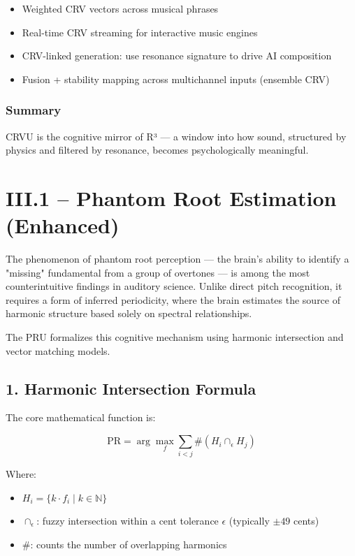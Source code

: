 \documentclass{article}
\begin{document}
\begin{itemize}
    \item Weighted CRV vectors across musical phrases
    \item Real-time CRV streaming for interactive music engines
    \item CRV-linked generation: use resonance signature to drive AI composition
    \item Fusion + stability mapping across multichannel inputs (ensemble CRV)
\end{itemize}

\subsubsection*{Summary}

CRVU is the cognitive mirror of R³ — a window into how sound, structured by physics and filtered by resonance, becomes psychologically meaningful.

\section*{III.1 – Phantom Root Estimation (Enhanced)}

The phenomenon of phantom root perception — the brain's ability to identify a "missing" fundamental from a group of overtones — is among the most counterintuitive findings in auditory science. Unlike direct pitch recognition, it requires a form of inferred periodicity, where the brain estimates the source of harmonic structure based solely on spectral relationships.

The PRU formalizes this cognitive mechanism using harmonic intersection and vector matching models.

\subsection*{1. Harmonic Intersection Formula}

The core mathematical function is:

\[
\text{PR} = \arg\max_f \sum_{i<j} \#(H_i \cap_\epsilon H_j)
\]

Where:

\begin{itemize}
    \item $H_i = \{k \cdot f_i \mid k \in \mathbb{N} \}$
    \item $\cap_\epsilon$: fuzzy intersection within a cent tolerance $\epsilon$ (typically $\pm49$ cents)
    \item $\#$: counts the number of overlapping harmonics
\end{itemize}
\end{document}
